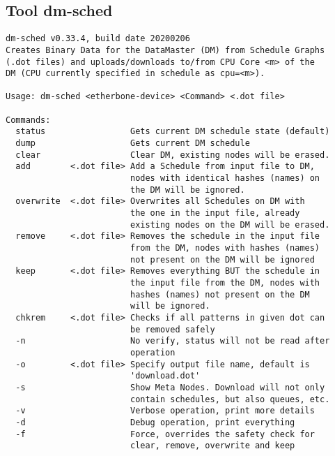 \subsection{Tool dm-sched}
\label{Tool_dm-sched}
\begin{lstlisting}[style = helptext]
dm-sched v0.33.4, build date 20200206
Creates Binary Data for the DataMaster (DM) from Schedule Graphs
(.dot files) and uploads/downloads to/from CPU Core <m> of the
DM (CPU currently specified in schedule as cpu=<m>).

Usage: dm-sched <etherbone-device> <Command> <.dot file>

Commands:
  status                 Gets current DM schedule state (default)
  dump                   Gets current DM schedule
  clear                  Clear DM, existing nodes will be erased.
  add        <.dot file> Add a Schedule from input file to DM,
                         nodes with identical hashes (names) on
                         the DM will be ignored.
  overwrite  <.dot file> Overwrites all Schedules on DM with
                         the one in the input file, already
                         existing nodes on the DM will be erased.
  remove     <.dot file> Removes the schedule in the input file
                         from the DM, nodes with hashes (names)
                         not present on the DM will be ignored
  keep       <.dot file> Removes everything BUT the schedule in
                         the input file from the DM, nodes with
                         hashes (names) not present on the DM
                         will be ignored.
  chkrem     <.dot file> Checks if all patterns in given dot can
                         be removed safely
  -n                     No verify, status will not be read after
                         operation
  -o         <.dot file> Specify output file name, default is
                         'download.dot'
  -s                     Show Meta Nodes. Download will not only
                         contain schedules, but also queues, etc.
  -v                     Verbose operation, print more details
  -d                     Debug operation, print everything
  -f                     Force, overrides the safety check for
                         clear, remove, overwrite and keep
\end{lstlisting}
